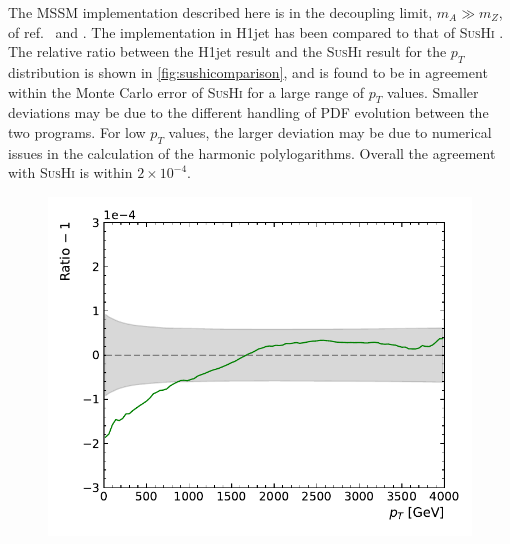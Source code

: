 \documentclass[12pt,a4wide]{article}
\begin{document}
The MSSM implementation described here is in the decoupling limit, $m_A \gg m_Z$, of ref.\ \cite{bib:mssm1} and \cite{bib:mssm2}. The implementation in H1jet has been compared to that of \textsc{SusHi} \cite{bib:sushi}. The relative ratio between the H1jet result and the \textsc{SusHi} result for the $p_T$ distribution is shown in \autoref{fig:sushicomparison}, and is found to be in agreement within the Monte Carlo error of \textsc{SusHi} for a large range of $p_T$ values. Smaller deviations may be due to the different handling of PDF evolution between the two programs. For low $p_T$ values, the larger deviation may be due to numerical issues in the calculation of the harmonic polylogarithms. Overall the agreement with \textsc{SusHi} is within $2 \times 10^{-4}$. 

\begin{figure}[tbh] 
\centering
\begin{minipage}{.485\textwidth}
  \centering
  \includegraphics[width=\linewidth]{figures/sushicomparison}
  \label{fig:sushicomparison}
\end{minipage}%
\hfill%
\begin{minipage}{.485\textwidth}
  \centering

\end{minipage}
\end{figure}
\end{document}
